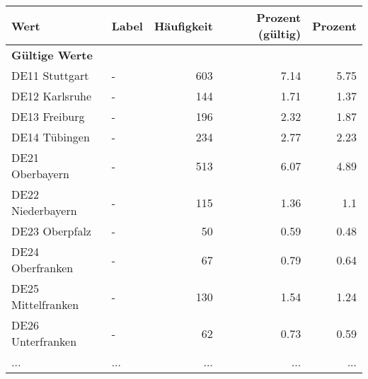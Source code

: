      \begin{longtable}{Xlrrr}
     \toprule
     \textbf{Wert} & \textbf{Label} & \textbf{Häufigkeit} & \textbf{Prozent (gültig)} & \textbf{Prozent} \\
     \endhead
     \midrule
     \multicolumn{5}{l}{\textbf{Gültige Werte}}\\
        \multicolumn{1}{X}{DE11 Stuttgart} & - & \num{603} & \num[round-mode=places,round-precision=2]{7.14} & \num[round-mode=places,round-precision=2]{5.75} \\
        \multicolumn{1}{X}{DE12 Karlsruhe} & - & \num{144} & \num[round-mode=places,round-precision=2]{1.71} & \num[round-mode=places,round-precision=2]{1.37} \\
        \multicolumn{1}{X}{DE13 Freiburg} & - & \num{196} & \num[round-mode=places,round-precision=2]{2.32} & \num[round-mode=places,round-precision=2]{1.87} \\
        \multicolumn{1}{X}{DE14 Tübingen} & - & \num{234} & \num[round-mode=places,round-precision=2]{2.77} & \num[round-mode=places,round-precision=2]{2.23} \\
        \multicolumn{1}{X}{DE21 Oberbayern} & - & \num{513} & \num[round-mode=places,round-precision=2]{6.07} & \num[round-mode=places,round-precision=2]{4.89} \\
        \multicolumn{1}{X}{DE22 Niederbayern} & - & \num{115} & \num[round-mode=places,round-precision=2]{1.36} & \num[round-mode=places,round-precision=2]{1.1} \\
        \multicolumn{1}{X}{DE23 Oberpfalz} & - & \num{50} & \num[round-mode=places,round-precision=2]{0.59} & \num[round-mode=places,round-precision=2]{0.48} \\
        \multicolumn{1}{X}{DE24 Oberfranken} & - & \num{67} & \num[round-mode=places,round-precision=2]{0.79} & \num[round-mode=places,round-precision=2]{0.64} \\
        \multicolumn{1}{X}{DE25 Mittelfranken} & - & \num{130} & \num[round-mode=places,round-precision=2]{1.54} & \num[round-mode=places,round-precision=2]{1.24} \\
        \multicolumn{1}{X}{DE26 Unterfranken} & - & \num{62} & \num[round-mode=places,round-precision=2]{0.73} & \num[round-mode=places,round-precision=2]{0.59} \\
       ... & ... & ... & ... & ... \\

\end{longtable}
